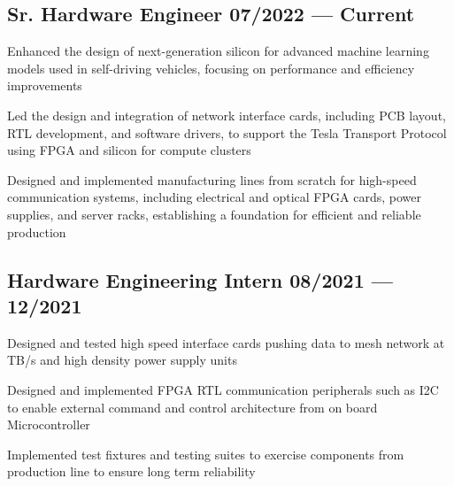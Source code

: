 \documentclass[letter,9pt]{article}
\begin{document}

\subsection{{Sr. Hardware Engineer \hfill 07/2022 --- Current}}
\begin{zitemize}
\item Enhanced the design of next-generation silicon for advanced machine learning models used in self-driving vehicles, focusing on performance and efficiency improvements
\item Led the design and integration of network interface cards, including PCB layout, RTL development, and software drivers, to support the Tesla Transport Protocol using FPGA and silicon for compute clusters
\item Designed and implemented manufacturing lines from scratch for high-speed communication systems, including electrical and optical FPGA cards, power supplies, and server racks, establishing a foundation for efficient and reliable production
\end{zitemize}
{\color{sectiondivide} \vspace{-0.75em}\hrulefill}

\subsection{{Hardware Engineering Intern \hfill 08/2021 --- 12/2021}}
\begin{zitemize}
\item Designed and tested high speed interface cards pushing data to mesh network at TB/s and high density power supply units
\item Designed and implemented FPGA RTL communication peripherals such as I2C to enable external command and control architecture from on board Microcontroller
\item Implemented test fixtures and testing suites to exercise components from production line to ensure long term reliability
\end{zitemize}
{\color{sectiondivide} \vspace{-0.75em}\hrulefill}
\end{document}
